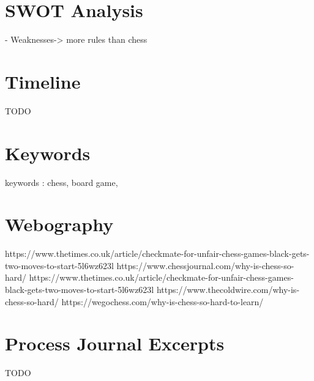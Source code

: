 \documentclass[12pt]{article}
\begin{document}
    
    \section{SWOT Analysis}
        
    - Weaknesses-> more rules than chess

    
    \section{Timeline}
        TODO
    
    \section{Keywords}
        keywords : chess, board game,
    
    \section{Webography}
        https://www.thetimes.co.uk/article/checkmate-for-unfair-chess-games-black-gets-two-moves-to-start-5l6wz623l
        https://www.chessjournal.com/why-is-chess-so-hard/
        https://www.thetimes.co.uk/article/checkmate-for-unfair-chess-games-black-gets-two-moves-to-start-5l6wz623l
        https://www.thecoldwire.com/why-is-chess-so-hard/
        https://wegochess.com/why-is-chess-so-hard-to-learn/

        
    \section{Process Journal Excerpts}
        TODO
    
\end{document}

